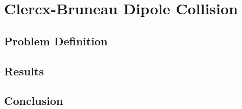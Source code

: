 \section{Clercx-Bruneau Dipole Collision}

\subsection{Problem Definition}

\subsection{Results}

\subsection{Conclusion}

%
%
%
%

%
%	
	

